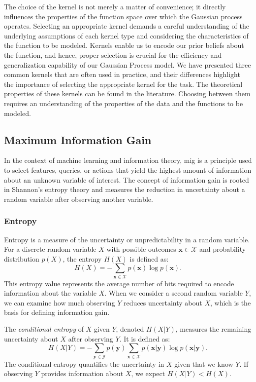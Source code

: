 The choice of the kernel is not merely a matter of convenience; it directly influences the properties of the function space over which the Gaussian process operates. Selecting an appropriate kernel demands a careful understanding of the underlying assumptions of each kernel type and considering the characteristics of the function to be modeled. Kernels enable us to encode our prior beliefs about the function, and hence, proper selection is crucial for the efficiency and generalization capability of our Gaussian Process model. We have presented three common kernels that are often used in practice, and their differences highlight the importance of selecting the appropriate kernel for the task. The theoretical properties of these kernels can be found in the literature. Choosing between them requires an understanding of the properties of the data and the functions to be modeled.
\subsection{Maximum Information Gain}
\label{section:MIG}
In the context of machine learning and information theory, \ac{mig} is a principle used to select features, queries, or actions that yield the highest amount of information about an unknown variable of interest. The concept of information gain is rooted in Shannon’s entropy theory and measures the reduction in uncertainty about a random variable after observing another variable. 

\subsubsection{Entropy}
\label{section:entropy}
Entropy is a measure of the uncertainty or unpredictability in a random variable. For a discrete random variable $X$ with possible outcomes $\mathbf{x} \in \mathcal{X}$ and probability distribution $p(X)$, the entropy $H(X)$ is defined as:
\[
H(X) = - \sum_{\mathbf{x} \in \mathcal{X}} p(\mathbf{x}) \log p(\mathbf{x}).
\]
This entropy value represents the average number of bits required to encode information about the variable $X$. When we consider a second random variable $Y$, we can examine how much observing $Y$ reduces uncertainty about $X$, which is the basis for defining information gain.

The \textit{conditional entropy} of $X$ given $Y$, denoted $H(X|Y)$, measures the remaining uncertainty about $X$ after observing $Y$. It is defined as:
\[
H(X|Y) = - \sum_{\mathbf{y} \in \mathcal{Y}} p(\mathbf{y}) \sum_{\mathbf{x} \in \mathcal{X}} p(\mathbf{x} | \mathbf{y}) \log p(\mathbf{x} | \mathbf{y}).
\]
The conditional entropy quantifies the uncertainty in $X$ given that we know $Y$. If observing $Y$ provides information about $X$, we expect $H(X|Y) < H(X)$.

